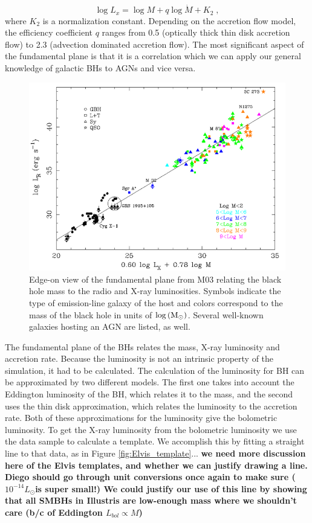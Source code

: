 \begin{equation}
\log L_{x}=\log M+q\log\dot{M}+K_{2}\;,\label{eq:LxFP}
\end{equation}
where $K_{2}$ is a normalization constant. Depending on the accretion
flow model, the efficiency coefficient $q$ ranges from 0.5 (optically
thick thin disk accretion flow) to 2.3 (advection dominated accretion
flow). The most significant aspect of the fundamental plane is that
it is a correlation which we can apply our general knowledge of galactic
BHs to AGNs and vice versa.
\begin{figure}
\centering{}\includegraphics[clip,scale=0.35]{Figures/FP} \protect\caption{\label{fig:Fp}Edge-on view of the fundamental plane from M03 relating
the black hole mass to the radio and X-ray luminosities. Symbols indicate
the type of emission-line galaxy of the host and colors correspond
to the mass of the black hole in units of $\log\left({\rm M}_{\odot}\right)$.
Several well-known galaxies hosting an AGN are listed, as well.}
\end{figure}


The fundamental plane of the BHs relates the mass, X-ray luminosity
and accretion rate. Because the luminosity is not an intrinsic property
of the simulation, it had to be calculated. The calculation of the
luminosity for BH can be approximated by two different models. The
first one takes into account the Eddington luminosity of the BH, which
relates it to the mass, and the second uses the thin disk approximation,
which relates the luminosity to the accretion rate. Both of these
approximations for the luminosity give the bolometric luminosity.
To get the X-ray luminosity from the bolometric luminosity we use
the \citet{elvis1994atlasof} data sample to calculate a template. 
We accomplish this by fitting a straight line to that data, 
as in Figure \ref{fig:Elvis_template}... 
\textbf{we need more discussion here of the Elvis templates, and 
whether we can justify drawing a line. Diego should go through unit
conversions once again to make sure ($10^{-14} L_{\odot}$is super small!)
We could justify our use of this line by showing that all SMBHs in 
Illustris are low-enough mass where we shouldn't care (b/c of 
Eddington $L_{bol} \propto M$) }

